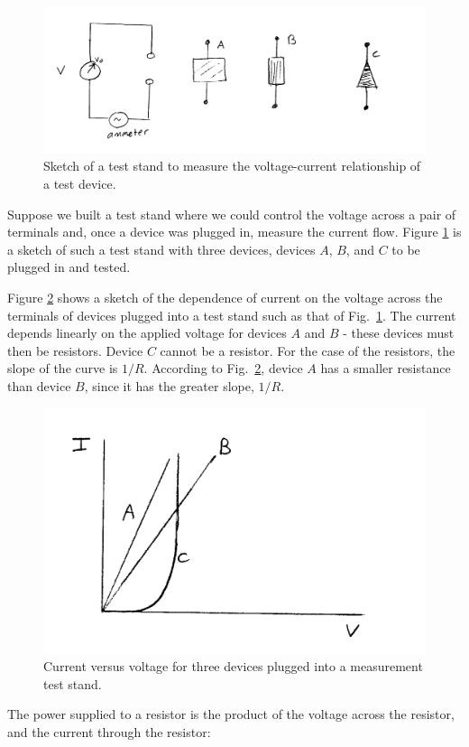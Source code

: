 \documentclass[12pt]{article}
\begin{document}
\begin{flushleft}
\begin{figure}[h]
\centering
\includegraphics*[trim=0cm 0cm 0cm 0cm, clip=true, width=0.8\columnwidth]{teststand.png}
\caption{\small Sketch of a test stand to measure the voltage-current relationship of a test device.}
\label{fig:teststand}
\end{figure}

Suppose we built a test stand where we could control the voltage across a pair of terminals and, once a device was plugged in, measure the current flow.  Figure \ref{fig:teststand} is a sketch of such a test stand with three devices, devices $A$, $B$, and $C$ to be plugged in and tested.

Figure \ref{fig:vicurves} shows a sketch of the dependence of current on the voltage across the terminals of devices plugged into a test stand such as that of Fig.~\ref{fig:teststand}.  The current depends linearly on the applied voltage for devices $A$ and $B$ - these devices must then be resistors.  Device $C$ cannot be a resistor.  For the case of the resistors, the slope of the curve is $1/R$.   According to Fig.~\ref{fig:vicurves}, device $A$ has a smaller resistance than device $B$, since it has the greater slope, $1/R$.

\begin{figure}[h]
\centering
\includegraphics*[trim=0cm 0cm 0cm 0cm, clip=true, width=0.5\columnwidth]{VI_curves.png}
\caption{\small Current versus voltage for three devices plugged into a measurement test stand.}
\label{fig:vicurves}
\end{figure}

The power supplied to a resistor is the product of the voltage across the resistor, and the current through the resistor:


\end{flushleft}
\end{document}
